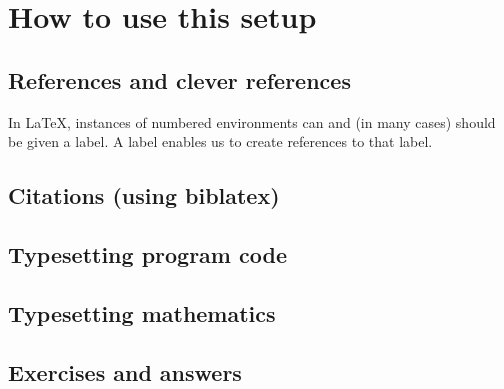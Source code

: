 \chapter{How to use this setup}\label{ch:howtouse}

\section{References and clever references}
In \LaTeX{}, instances of numbered environments can and (in many cases) should be given a label. A label enables us to create references to that label.

\section{Citations (using biblatex)}

\section{Typesetting program code}

\section{Typesetting mathematics}

\section{Exercises and answers}
